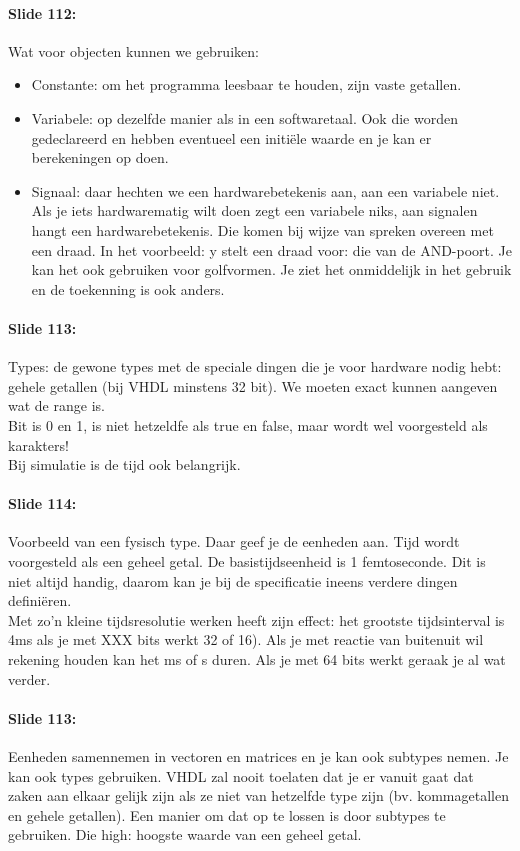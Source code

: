\documentclass[10pt,a4paper]{book}
\begin{document}
\paragraph{Slide 112:} Wat voor objecten kunnen we gebruiken:
\begin{itemize}
\item Constante: om het programma leesbaar te houden, zijn vaste getallen. 	
\item Variabele: op dezelfde manier als in een softwaretaal. Ook die worden gedeclareerd en hebben eventueel een initi\"ele waarde en je kan er berekeningen op doen. 	
\item Signaal: daar hechten we een hardwarebetekenis aan, aan een variabele niet. Als je iets hardwarematig wilt doen zegt een variabele niks, aan signalen hangt een hardwarebetekenis. Die komen bij wijze van spreken overeen met een draad. In het voorbeeld: y stelt een draad voor: die van de AND-poort. Je kan het ook gebruiken voor golfvormen. Je ziet het onmiddelijk in het gebruik en de toekenning is ook anders. 
\end{itemize}

\paragraph{Slide 113:} Types: de gewone types met de speciale dingen die je voor hardware nodig hebt: gehele getallen (bij VHDL minstens 32 bit). We moeten exact kunnen aangeven wat de range is.\\
Bit is 0 en 1, is niet hetzeldfe als true en false, maar wordt wel voorgesteld als karakters!\\
Bij simulatie is de tijd ook belangrijk.

\paragraph{Slide 114:} Voorbeeld van een fysisch type. Daar geef je de eenheden aan. Tijd wordt voorgesteld als een geheel getal. De basistijdseenheid is 1 femtoseconde. Dit is niet altijd handig, daarom kan je bij de specificatie ineens verdere dingen defini\"eren.\\
Met zo'n kleine tijdsresolutie werken heeft zijn effect: het grootste tijdsinterval is 4ms als je met XXX bits werkt 32 of 16). Als je met reactie van buitenuit wil rekening houden kan het ms of s duren. Als je met 64 bits werkt geraak je al wat verder. 

\paragraph{Slide 113:} Eenheden samennemen in vectoren en matrices en je kan ook subtypes nemen. Je kan ook types gebruiken. VHDL zal nooit toelaten dat je er vanuit gaat dat zaken aan elkaar gelijk zijn als ze niet van hetzelfde type zijn (bv. kommagetallen en gehele getallen). Een manier om dat op te lossen is door subtypes te gebruiken. Die high: hoogste waarde van een geheel getal.
\end{document}
